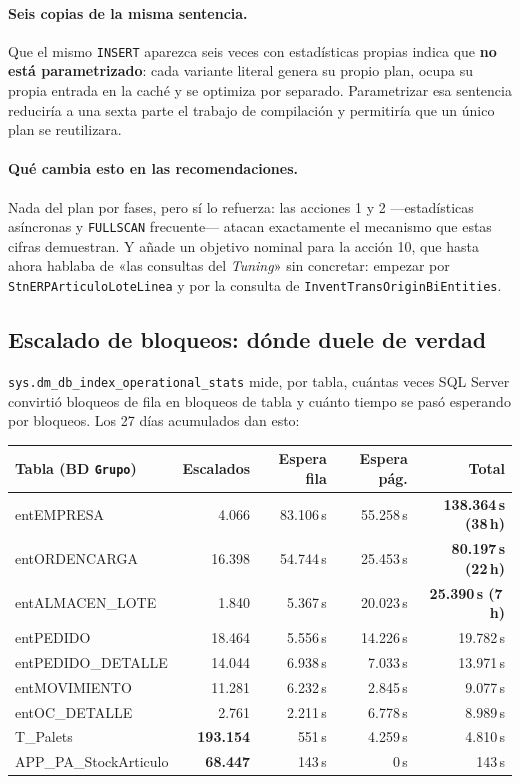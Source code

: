 \documentclass[11pt,a4paper]{article}
\newcommand{\cod}[1]{\texttt{\small #1}}
\newcommand{\critico}[1]{\textcolor{rojo}{\textbf{#1}}}
\newcommand{\aviso}[1]{\textcolor{ambar}{\textbf{#1}}}
\begin{document}
\paragraph{Seis copias de la misma sentencia.} Que el mismo \cod{INSERT}
aparezca seis veces con estadísticas propias indica que \textbf{no está
parametrizado}: cada variante literal genera su propio plan, ocupa su propia
entrada en la caché y se optimiza por separado. Parametrizar esa sentencia
reduciría a una sexta parte el trabajo de compilación y permitiría que un
único plan se reutilizara.

\paragraph{Qué cambia esto en las recomendaciones.} Nada del plan por fases,
pero sí lo refuerza: las acciones 1 y 2 —estadísticas asíncronas y
\cod{FULLSCAN} frecuente— atacan exactamente el mecanismo que estas cifras
demuestran. Y añade un objetivo nominal para la acción 10, que hasta ahora
hablaba de «las consultas del \emph{Tuning}» sin concretar: empezar por
\cod{StnERPArticuloLoteLinea} y por la consulta de
\cod{InventTransOriginBiEntities}.

\subsection{Escalado de bloqueos: dónde duele de verdad}

\cod{sys.dm\_db\_index\_operational\_stats} mide, por tabla, cuántas veces
SQL Server convirtió bloqueos de fila en bloqueos de tabla y cuánto tiempo se
pasó esperando por bloqueos. Los 27 días acumulados dan esto:

\begin{table}[h]
\centering
\small
\begin{tabular}{lrrrr}
\toprule
\textbf{Tabla (BD \cod{Grupo})} & \textbf{Escalados} & \textbf{Espera fila} &
\textbf{Espera pág.} & \textbf{Total} \\
\midrule
entEMPRESA        &  4.066 & 83.106\,s & 55.258\,s & \critico{138.364\,s (38\,h)} \\
entORDENCARGA     & 16.398 & 54.744\,s & 25.453\,s & \critico{80.197\,s (22\,h)} \\
entALMACEN\_LOTE  &  1.840 &  5.367\,s & 20.023\,s & \critico{25.390\,s (7\,h)} \\
entPEDIDO         & 18.464 &  5.556\,s & 14.226\,s & 19.782\,s \\
entPEDIDO\_DETALLE& 14.044 &  6.938\,s &  7.033\,s & 13.971\,s \\
entMOVIMIENTO     & 11.281 &  6.232\,s &  2.845\,s &  9.077\,s \\
entOC\_DETALLE    &  2.761 &  2.211\,s &  6.778\,s &  8.989\,s \\
T\_Palets         & \aviso{193.154} & 551\,s & 4.259\,s & 4.810\,s \\
APP\_PA\_StockArticulo & \aviso{68.447} & 143\,s & 0\,s & 143\,s \\
\bottomrule
\end{tabular}
\end{table}
\end{document}

